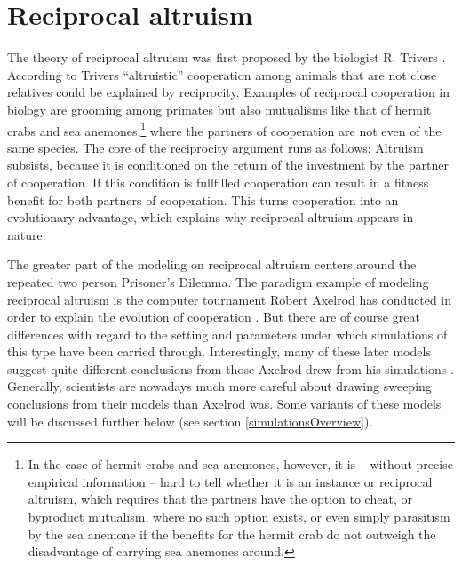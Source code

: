 \section{Reciprocal altruism}
\label{reciprocalAltruism}

The theory of reciprocal altruism was first proposed by the biologist R.
Trivers \cite[]{trivers:1971}. According to Trivers ``altruistic'' cooperation
among animals that are not close relatives could be explained by reciprocity.
Examples of reciprocal cooperation in biology are grooming among primates but
also mutualisms like that of hermit crabs and sea anemones,\footnote{In the
  case of hermit crabs and sea anemones, however, it is -- without precise
  empirical information -- hard to tell whether it is an instance or reciprocal
  altruism, which requires that the partners have the option to cheat, or
  byproduct mutualism, where no such option exists, or even simply parasitism
  by the sea anemone if the benefits for the hermit crab do not outweigh the
  disadvantage of carrying sea anemones around.} where the partners of
cooperation are not even of the same species. The core of the reciprocity
argument runs as follows: Altruism subsists, because it is conditioned on the
return of the investment by the partner of cooperation. If this condition is
fullfilled cooperation can result in a fitness benefit for both partners of
cooperation. This turns cooperation into an evolutionary
advantage, which explains why reciprocal altruism appears in nature.

The greater part of the modeling on reciprocal altruism centers around the
repeated two person Prisoner's Dilemma. The paradigm example of modeling
reciprocal altruism is the computer tournament Robert Axelrod has conducted in
order to explain the evolution of cooperation \cite[]{axelrod:1984}. But there
are of course great differences with regard to the setting and parameters
under which simulations of this type have been carried through. Interestingly,
many of these later models suggest quite different conclusions from those
Axelrod drew from his simulations \cite[p.\  313ff.]{binmore:1998}.
Generally, scientists are nowadays much more careful about drawing sweeping
conclusions from their models than Axelrod was. Some variants of these models
will be discussed further below (see section \ref{simulationsOverview}).

